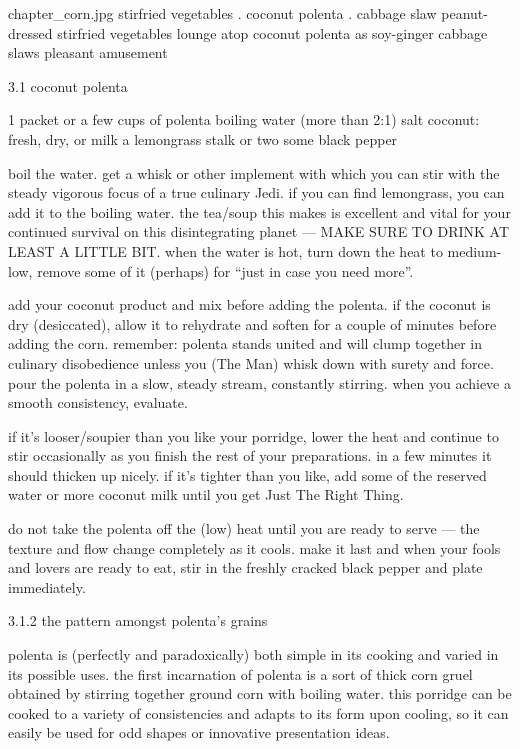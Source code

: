 \mychapter
{chapter_corn.jpg}
{stirfried vegetables . coconut polenta . cabbage slaw}
{peanut-dressed stirfried vegetables lounge atop coconut polenta as
soy-ginger cabbage slaws pleasant amusement}

3.1  coconut polenta

1 packet or a few cups of polenta
boiling water (more than 2:1)
salt
coconut: fresh, dry, or milk
a lemongrass stalk or two
some black pepper

boil the water. get a whisk or other implement with which you can stir with the steady vigorous focus of a true culinary Jedi. if you can find lemongrass, you can add it to the boiling water. the tea/soup this makes is excellent and vital for your continued survival on this disintegrating planet --- MAKE SURE TO DRINK AT LEAST A LITTLE BIT. when the water is hot, turn down the heat to medium-low, remove some of it (\onethird perhaps) for ``just in case you need more''.

add your coconut product and mix before adding the polenta. if the coconut is dry (desiccated), allow it to rehydrate and soften for a couple of minutes before adding the corn. remember: polenta stands united and will clump together in culinary disobedience unless you (The Man) whisk down with surety and force. pour the polenta in a slow, steady stream, constantly stirring. when you achieve a smooth consistency, evaluate.

if it's looser/soupier than you like your porridge, lower the heat and continue to stir occasionally as you finish the rest of your preparations. in a few minutes it should thicken up nicely. if it's tighter than you like, add some of the reserved water or more coconut milk until you get Just The Right Thing.

do not take the polenta off the (low) heat until you are ready to serve --- the texture and flow change completely as it cools. make it last and when your fools and lovers are ready to eat, stir in the freshly cracked black pepper and plate immediately.


3.1.2 the pattern amongst polenta's grains

polenta is (perfectly and paradoxically) both simple in its cooking and varied in its possible uses. the first incarnation of polenta is a sort of thick corn gruel obtained by stirring together ground corn with boiling water. this porridge can be cooked to a variety of consistencies and adapts to its form upon cooling, so it can easily be used for odd shapes or innovative presentation ideas.

